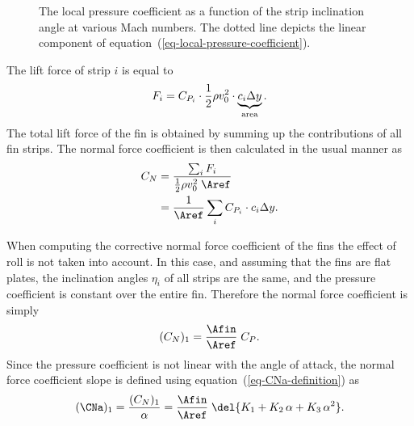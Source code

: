 \begin{figure}
\centering
{}
\caption{The local pressure coefficient as a function of the
  strip inclination angle at various Mach numbers.  The dotted line
  depicts the linear component of
  equation~(\ref{eq-local-pressure-coefficient}).}
\label{fig-fin-strip-pressure-coefficient}
\end{figure}



The lift force of strip $i$ is equal to
%
\begin{equation}
F_i = C_{P_i} \cdot \frac{1}{2} \rho v_0^2 \cdot 
  \underbrace{c_i \Delta y}_{\rm area}.
\label{eq-supersonic-strip-lift-force}
\end{equation}
%
The total lift force of the fin is obtained by summing up the
contributions of all fin strips.  The normal force coefficient is then
calculated in the usual manner as
%
\begin{align}
C_N &= \frac{\sum_i F_i}{\frac{1}{2}\rho v_0^2\; \Aref} \\
    &= \frac{1}{\Aref}\sum_i C_{P_i} \cdot c_i\Delta y.
\end{align}

When computing the corrective normal force coefficient of the fins the
effect of roll is not taken into account.  In this case, and
assuming that the fins are flat plates, the inclination angles
$\eta_i$ of all strips are the same, and the pressure coefficient is
constant over the entire fin.  Therefore the normal force coefficient
is simply
%
\begin{equation}
(C_N)_1 = \frac{\Afin}{\Aref} \;C_P.
\end{equation}
%
Since the pressure coefficient is not linear with the angle of attack,
the normal force coefficient slope is defined using
equation~(\ref{eq-CNa-definition}) as
%
\begin{equation}
(\CNa)_1 = \frac{(C_N)_1}{\alpha} = 
 \frac{\Afin}{\Aref} \; \del{K_1 + K_2\,\alpha + K_3\,\alpha^2}.
\end{equation}




